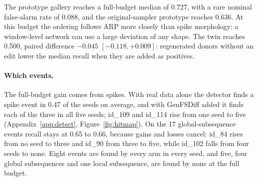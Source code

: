 \documentclass[11pt,a4paper]{article}
\begin{document}
The prototype gallery reaches a full-budget median of 0.727, with a rare
nominal false-alarm rate of 0.088, and the original-sampler prototype reaches
0.636. At this budget the ordering follows ARP more closely than spike
morphology: a window-level network can use a large deviation of any shape. The
twin reaches 0.500, paired difference $-0.045$ $[-0.118, +0.009]$: regenerated
donors without an edit lower the median recall when they are added as
positives.

\paragraph{Which events.}
The full-budget gain comes from spikes. With real data alone the detector
finds a spike event in 0.47 of the seeds on average, and with GenFSDiff added
it finds each of the three in all five seeds; id\_109 and id\_114 rise from
one seed to five (Appendix~\ref{app:detect},
Figure~\ref{fig:hitmap}). On the 17 global-subsequence events recall stays at
0.65 to 0.66, because gains and losses cancel: id\_84 rises from no seed to
three and id\_90 from three to five, while id\_102 falls from four seeds to
none. Eight events are found by every arm in every seed, and five, four global
subsequences and one local subsequence, are found by none at the full budget.
\end{document}
